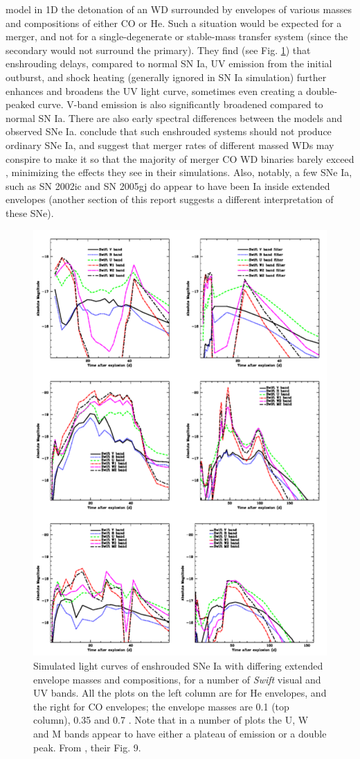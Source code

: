 \cite{frye+10} model in 1D the detonation of an {\Mchan} WD surrounded by envelopes of various masses and compositions of either CO or He.  Such a situation would be expected for a merger, and not for a single-degenerate  or stable-mass transfer system (since the secondary would not surround the primary).  They find (see Fig. \ref{fryerfig}) that enshrouding delays, compared to normal SN Ia, UV emission from the initial outburst, and shock heating (generally ignored in SN Ia simulation) further enhances and broadens the UV light curve, sometimes even creating a double-peaked curve.  V-band emission is also significantly broadened compared to normal SN Ia.  There are also early spectral differences between the models and observed SNe Ia.  \citeauthor{frye+10} conclude that such enshrouded systems should not produce ordinary SNe Ia, and suggest that merger rates of different massed WDs may conspire to make it so that the majority of merger CO WD binaries barely exceed {\Mchan}, minimizing the effects they see in their simulations.  Also, notably, a few SNe Ia, such as SN 2002ic and SN 2005gj do appear to have been Ia inside extended envelopes (another section of this report suggests a different interpretation of these SNe).

\begin{figure}
\centerline{\includegraphics[width=0.8\hsize]{fryerfig.pdf}}
\caption{Simulated light curves of enshrouded SNe Ia with differing extended envelope masses and compositions, for a number of \textit{Swift} visual and UV bands.  All the plots on the left column are for He envelopes, and the right for CO envelopes; the envelope masses are 0.1 (top column), 0.35 and 0.7 {\Msun}.  Note that in a number of plots the U, W and M bands appear to have either a plateau of emission or a double peak.  From \cite{frye+10}, their Fig. 9.}
\label{fryerfig}
\end{figure}

